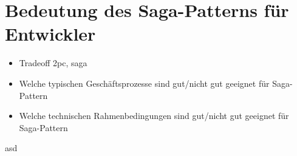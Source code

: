 \section{Bedeutung des Saga-Patterns für Entwickler}
\begin{itemize}
	\item Tradeoff 2pc, saga
	\item Welche typischen Geschäftsprozesse sind gut/nicht gut geeignet für Saga-Pattern
	\item Welche technischen Rahmenbedingungen sind gut/nicht gut geeignet für Saga-Pattern
\end{itemize}
asd
